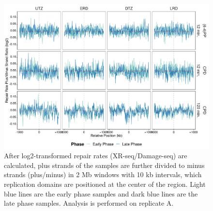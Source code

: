 \begin{figure}[H]
\begin{center}
\includegraphics[width=\textwidth]{Chapters/7_appendix/figures/supfig34}
\caption[Repair rate plus/minus phase ratio of replication domains in 2 Mb (replicate A).]{After log2-transformed repair rates (XR-seq/Damage-seq) are calculated, plus strands of the samples are further divided to minus strands (plus/minus) in 2 Mb windows with 10 kb intervals, which replication domains are positioned at the center of the region. Light blue lines are the early phase samples and dark blue lines are the late phase samples. Analysis is performed on replicate A.}
\label{supfig:rrpm2000repdomainA}
\end{center}
\end{figure}

